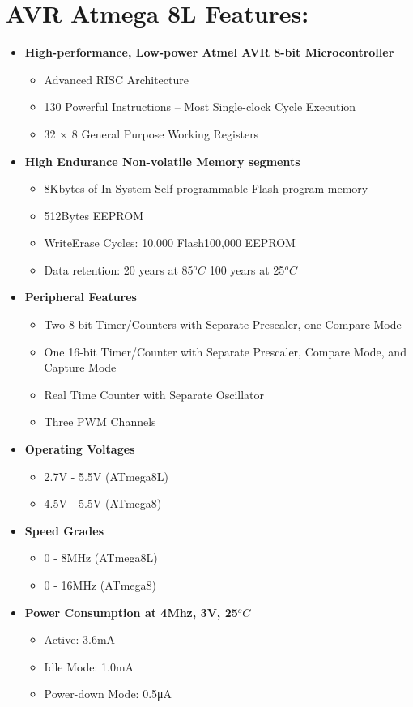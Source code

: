 \documentclass[12pt, a4paper]{article}
\begin{document}
\section{AVR Atmega 8L Features:}
\begin{itemize}
\item \textbf{High-performance, Low-power Atmel AVR 8-bit Microcontroller}
\begin{itemize}
\item Advanced RISC Architecture
\item 130 Powerful Instructions – Most Single-clock Cycle Execution
\item 32 × 8 General Purpose Working Registers
\end{itemize}
\item \textbf{High Endurance Non-volatile Memory segments}
\begin{itemize}
\item 8Kbytes of In-System Self-programmable Flash program memory
\item 512Bytes EEPROM
\item WriteErase Cycles: 10,000 Flash100,000 EEPROM
\item Data retention: 20 years at 85$^oC$ 100 years at 25$^oC$
\end{itemize}

\item \textbf{Peripheral Features}
\begin{itemize}
\item Two 8-bit Timer/Counters with Separate Prescaler, one Compare Mode
\item One 16-bit Timer/Counter with Separate Prescaler, Compare Mode, and Capture Mode
\item Real Time Counter with Separate Oscillator
\item Three PWM Channels
\end{itemize}

\item \textbf{Operating Voltages}
\begin{itemize}
\item 2.7V - 5.5V (ATmega8L)
\item 4.5V - 5.5V (ATmega8)
\end{itemize}
\item \textbf{Speed Grades}
\begin{itemize}
\item 0 - 8MHz (ATmega8L)
\item 0 - 16MHz (ATmega8)
\end{itemize}
\item \textbf{Power Consumption at 4Mhz, 3V, 25$^oC$}
\begin{itemize}
\item Active: 3.6mA
\item Idle Mode: 1.0mA
\item Power-down Mode: 0.5μA
\end{itemize}
\end{itemize}
\end{document}

